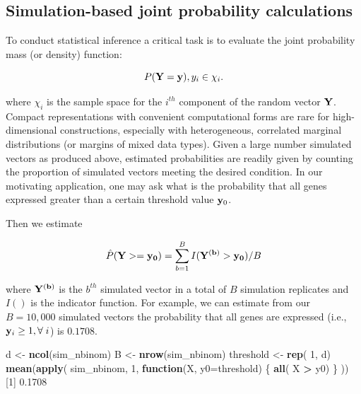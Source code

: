 \documentclass[]{article}
\newenvironment{Shaded}{\begin{snugshade}}{\end{snugshade}}
\newcommand{\ControlFlowTok}[1]{\textcolor[rgb]{0.13,0.29,0.53}{\textbf{#1}}}
\newcommand{\DataTypeTok}[1]{\textcolor[rgb]{0.13,0.29,0.53}{#1}}
\newcommand{\DecValTok}[1]{\textcolor[rgb]{0.00,0.00,0.81}{#1}}
\newcommand{\FloatTok}[1]{\textcolor[rgb]{0.00,0.00,0.81}{#1}}
\newcommand{\KeywordTok}[1]{\textcolor[rgb]{0.13,0.29,0.53}{\textbf{#1}}}
\newcommand{\NormalTok}[1]{#1}
\newcommand{\OperatorTok}[1]{\textcolor[rgb]{0.81,0.36,0.00}{\textbf{#1}}}
\newcommand{\StringTok}[1]{\textcolor[rgb]{0.31,0.60,0.02}{#1}}
\begin{document}
\hypertarget{simulation-based-joint-probability-calculations}{%
\subsection{Simulation-based joint probability calculations}\label{simulation-based-joint-probability-calculations}}

To conduct statistical inference a critical task is to evaluate the joint probability mass (or density) function:

\[
P( {\bf Y} = {\bf y} ), y_i \in \chi_i.
\]

where \(\chi_i\) is the sample space for the \(i^{th}\) component of the random vector \(\bf{Y}\).
Compact representations with convenient computational forms are rare for high-dimensional constructions, especially with heterogeneous, correlated marginal distributions (or margins of mixed data types).
Given a large number simulated vectors as produced above, estimated probabilities are readily given by counting the proportion of simulated vectors meeting the desired condition.
In our motivating application, one may ask what is the probability that all genes expressed greater than a certain threshold value \({ \bf y}_0\).

Then we estimate

\[
\hat{P}( {\bf Y} >= {\bf y_0 } ) = \sum_{b=1}^B I( {\bf Y^{(b) }} > {\bf y_0 } ) / B
\]

where \({\bf Y^{(b)} }\) is the \(b^{th}\) simulated vector in a total of \(B\) simulation replicates and \(I ( )\) is the indicator function.
For example, we can estimate from our \(B=10,000\) simulated vectors the probability that all genes are expressed (i.e., \({\bf y}_i \geq 1, \forall \; i\)) is \(0.1708\).

\begin{Shaded}
\begin{Highlighting}[]
\NormalTok{d <-}\StringTok{ }\KeywordTok{ncol}\NormalTok{(sim_nbinom)}
\NormalTok{B <-}\StringTok{ }\KeywordTok{nrow}\NormalTok{(sim_nbinom)}
\NormalTok{threshold <-}\StringTok{ }\KeywordTok{rep}\NormalTok{( }\DecValTok{1}\NormalTok{, d)}
\KeywordTok{mean}\NormalTok{(}\KeywordTok{apply}\NormalTok{( sim_nbinom,  }\DecValTok{1}\NormalTok{,}
           \ControlFlowTok{function}\NormalTok{(X, }\DataTypeTok{y0=}\NormalTok{threshold) \{}
               \KeywordTok{all}\NormalTok{( X }\OperatorTok{>}\StringTok{ }\NormalTok{y0) \}}
\NormalTok{           ))}
\NormalTok{[}\DecValTok{1}\NormalTok{] }\FloatTok{0.1708}
\end{Highlighting}
\end{Shaded}
\end{document}
